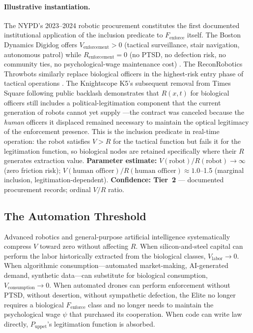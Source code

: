 \paragraph{Illustrative instantiation.}
The NYPD's 2023--2024 robotic procurement constitutes the first documented institutional application of the inclusion predicate to $F_{\text{enforce}}$ itself. The Boston Dynamics Digidog offers $V_{\text{enforcement}} > 0$ (tactical surveillance, stair navigation, autonomous patrol) while $R_{\text{enforcement}} = 0$ (no PTSD, no defection risk, no community ties, no psychological-wage maintenance cost) \cite{nypd_digidog}. The ReconRobotics Throwbots similarly replace biological officers in the highest-risk entry phase of tactical operations \cite{reconrobotics_throwbot}. The Knightscope K5's subsequent removal from Times Square following public backlash demonstrates that $R(x,t)$ for biological officers still includes a political-legitimation component that the current generation of robots cannot yet supply \cite{knightscope_k5_nyc}---the contract was canceled because the \textit{human} officers it displaced remained necessary to maintain the optical legitimacy of the enforcement presence. This is the inclusion predicate in real-time operation: the robot satisfies $V > R$ for the tactical function but fails it for the legitimation function, so biological nodes are retained specifically where their $R$ generates extraction value. \textbf{Parameter estimate:} $V(\text{robot}) / R(\text{robot}) \to \infty$ (zero friction risk); $V(\text{human officer}) / R(\text{human officer}) \approx 1.0$--1.5 (marginal inclusion, legitimation-dependent). \textbf{Confidence: Tier~2} --- documented procurement records; ordinal $V/R$ ratio.

\subsection{The Automation Threshold}

Advanced robotics and general-purpose artificial intelligence systematically compress $V$ toward zero without affecting $R$. When silicon-and-steel capital can perform the labor historically extracted from the biological classes, $V_{\text{labor}} \to 0$. When algorithmic consumption---automated market-making, AI-generated demand, synthetic data---can substitute for biological consumption, $V_{\text{consumption}} \to 0$. When automated drones can perform enforcement without PTSD, without desertion, without sympathetic defection, the Elite no longer requires a biological $F_{\text{enforce}}$ class and no longer needs to maintain the psychological wage $\psi$ that purchased its cooperation. When code can write law directly, $P_{\text{uppet}}$'s legitimation function is absorbed.

